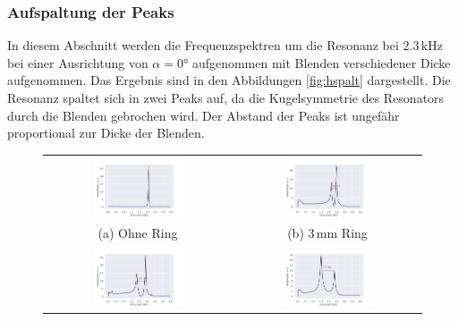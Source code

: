 \subsubsection{Aufspaltung der Peaks}
In diesem Abschnitt werden die Frequenzspektren um die Resonanz bei $2.3 \,\si{\kilo\hertz}$ bei einer Ausrichtung von $\alpha = 0°$ aufgenommen mit Blenden verschiedener Dicke aufgenommen. Das Ergebnis sind in den Abbildungen \ref{fig:hspalt} dargestellt. 
Die Resonanz spaltet sich in zwei Peaks auf, da die Kugelsymmetrie des Resonators durch die Blenden gebrochen wird. Der Abstand der Peaks ist ungefähr proportional zur Dicke der Blenden.
\begin{figure}[H]
  \centering
  \begin{tabular}{cc}
    \includegraphics[width=0.5\textwidth]{Daten/Wasserstoff/neu/spalt0.pdf} &   \includegraphics[width=0.5\textwidth]{Daten/Wasserstoff/neu/spalt1.pdf} \\
  (a) Ohne Ring & (b) $3 \,\si{\milli\metre}$ Ring \\[6pt]
  \includegraphics[width=0.5\textwidth]{Daten/Wasserstoff/neu/spalt2.pdf} &   \includegraphics[width=0.5\textwidth]{Daten/Wasserstoff/neu/spalt3.pdf} \\

\end{tabular}
\end{figure}
